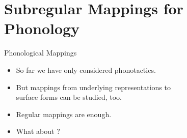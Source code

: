 \documentclass[xcolor={usenames,svgnames,x11names,table}]{beamer}
\begin{document}
\section[Mappings]{Subregular Mappings for Phonology}

\begin{frame}{Phonological Mappings}
    \begin{itemize}
        \item So far we have only considered phonotactics.
        \item But mappings from underlying representations to\\
            surface forms can be studied, too.
        \item Regular mappings are enough.\\
        \item What about ?
    \end{itemize}
\end{frame}
\end{document}
